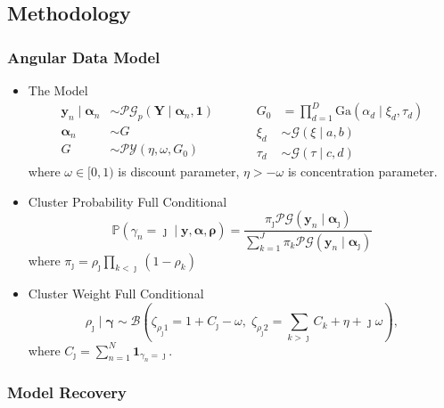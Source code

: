 \documentclass[aspectratio=169,10pt]{beamer}
\begin{document}
\subsection{Methodology}

\begin{frame}
    \frametitle{Angular Data Model}
    {\small 
    \begin{itemize}
        \item The Model
        \[
        \begin{aligned}
                \bm{y}_n \mid \bm{\alpha}_n &\sim
                    \mathcal{PG}_p\left(\bm{Y}\mid\bm{\alpha}_n,\bm{1}\right)\\
                \bm{\alpha}_n &\sim G\\
                G &\sim \mathcal{PY}\left(\eta, \omega, G_0\right)        
            \end{aligned}
            ~\hspace{1cm}
            \begin{aligned}
                G_0 &= {\textstyle\prod}_{d = 1}^{D}
                    \text{Ga}(\alpha_{d}\mid \xi_{d},\tau_{d})\\
                \xi_{d} &\sim \mathcal{G}(\xi\mid a, b)\\
                \tau_{d} &\sim \mathcal{G}(\tau\mid c, d)
            \end{aligned}
        \]
        where $\omega \in [0,1)$ is discount parameter, $\eta > -\omega$ is concentration parameter.
    \item Cluster Probability Full Conditional
        \[
        \mathbb{P}\left(\gamma_n = \jmath\mid \bm{y},\bm{\alpha},\bm{\rho}\right) = 
            \frac{\pi_\jmath\mathcal{PG}(\bm{y}_n\mid\bm{\alpha}_{\jmath})}{
                \sum_{k = 1}^J \pi_k\mathcal{PG}(\bm{y}_n\mid\bm{\alpha}_{\jmath})}
        \]
        where $\pi_{\jmath} = \rho_{\jmath}\prod_{k < \jmath}(1 - \rho_k)$
        \item Cluster Weight Full Conditional
        \[
        \rho_{\jmath}\mid\bm{\gamma} \sim 
            \mathcal{B}\left(\zeta_{\rho_\jmath 1} = 1 + C_{\jmath} - \omega,\; 
            \zeta_{\rho_{\jmath} 2} = {\textstyle \sum}_{k>\jmath} 
                C_k + \eta + \jmath \omega\right),
        \]
        where $C_\jmath = \sum_{n = 1}^N\bm{1}_{\gamma_n = \jmath}$.
    \end{itemize}
    }
\end{frame} %

\subsubsection{Model Recovery}
\end{document}
